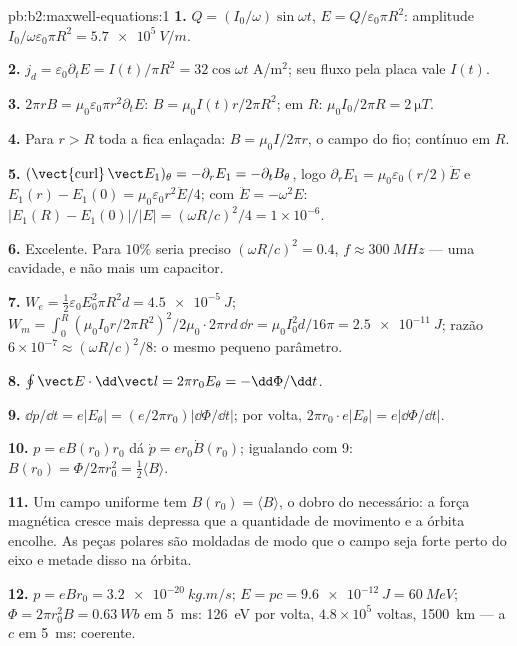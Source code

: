 \begin{solution}{pb:b2:maxwell-equations:1}
\textbf{1.} $Q = (I_0/\omega)\sin\omega t$, $E = Q/\varepsilon_0\pi R^2$: amplitude $I_0/\omega\varepsilon_0
\pi R^2 = \qty{5.7e5}{V/m}$.

\textbf{2.} $j_d = \varepsilon_0\partial_tE = I(t)/\pi R^2 = 32\cos\omega t$ A/m$^2$; seu fluxo
pela placa vale $I(t)$.

\textbf{3.} $2\pi rB = \mu_0\varepsilon_0\pi r^2\partial_tE$: $B = \mu_0I(t)r/2\pi R^2$; em $R$:
$\mu_0I_0/2\pi R = \qty{2}{\micro T}$.

\textbf{4.} Para $r > R$ toda a  fica enlaçada: $B =
\mu_0I/2\pi r$, o campo do fio; contínuo em $R$.

\textbf{5.} $(\operatorname{\vect{curl}}\vect E_1)_\theta = -\partial_rE_1 = -\partial_tB_\theta$, logo $\partial_rE_1
= \mu_0\varepsilon_0(r/2)\ddot E$ e $E_1(r) - E_1(0) = \mu_0\varepsilon_0r^2\ddot E/4$; com
$\ddot E = -\omega^2E$: $|E_1(R) - E_1(0)|/|E| = (\omega R/c)^2/4 = 1 \times 10^{-6}$.

\textbf{6.} Excelente. Para $10\%$ seria preciso $(\omega R/c)^2 = 0.4$, $f \approx \qty{300}{MHz}$ ---
uma cavidade, e não mais um capacitor.

\textbf{7.} $W_e = \tfrac12\varepsilon_0E_0^2\pi R^2d = \qty{4.5e-5}{J}$; $W_m = \int_0^R(\mu_0I_0r/
2\pi R^2)^2/2\mu_0\cdot2\pi rd\,\dd r = \mu_0I_0^2d/16\pi = \qty{2.5e-11}{J}$; razão $6 \times
10^{-7} \approx (\omega R/c)^2/8$: o mesmo pequeno parâmetro.

\textbf{8.} $\oint\vect E\cdot\dd\vect l = 2\pi r_0E_\theta = -\dd\Phi/\dd t$.

\textbf{9.} $\dd p/\dd t = e|E_\theta| = (e/2\pi r_0)|\dd\Phi/\dd t|$; por volta,
$2\pi r_0\cdot e|E_\theta| = e|\dd\Phi/\dd t|$.

\textbf{10.} $p = eB(r_0)r_0$ dá $\dot p = er_0\dot B(r_0)$; igualando com 9:
$B(r_0) = \Phi/2\pi r_0^2 = \tfrac12\langle B\rangle$.

\textbf{11.} Um campo uniforme tem $B(r_0) = \langle B\rangle$, o dobro do necessário:
a força magnética cresce mais depressa que a quantidade de movimento e a órbita
encolhe. As peças polares são moldadas de modo que o campo seja forte perto do
eixo e metade disso na órbita.

\textbf{12.} $p = eBr_0 = \qty{3.2e-20}{kg.m/s}$; $E = pc = \qty{9.6e-12}{J} = \qty{60}{MeV}$;
$\Phi = 2\pi r_0^2B = \qty{0.63}{Wb}$ em \qty{5}{ms}: \qty{126}{eV} por volta, $4.8 \times
10^5$ voltas, \qty{1500}{km} --- a $c$ em \qty{5}{ms}: coerente.


\end{solution}
